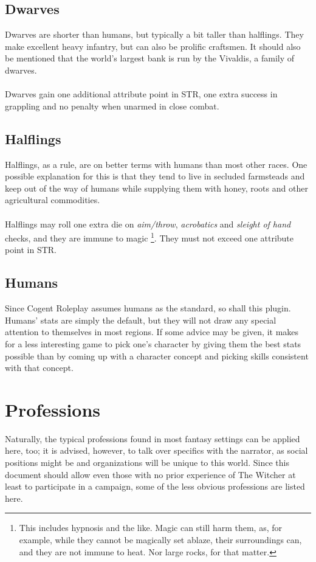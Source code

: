 \documentclass[parskip=full,11pt,%
footheight=38pt]{scrreport}
\begin{document}
\subsection{Dwarves}
Dwarves are shorter than humans, but typically a bit taller than halflings. They make excellent
heavy infantry, but can also be prolific craftsmen. It should also be mentioned that the world's
largest bank is run by the Vivaldis, a family of dwarves.
\\\\
Dwarves gain one additional attribute point in STR, one extra success in grappling and no penalty
when unarmed in close combat.

\subsection{Halflings}
Halflings, as a rule, are on better terms with humans than most other races. One possible explanation for this is that they tend to live
in secluded farmsteads and keep out of the way of humans while supplying them with honey, roots and other agricultural commodities.
\\\\
Halflings may roll one extra die on \textit{aim/throw}, \textit{acrobatics} and \textit{sleight of hand} checks, and they are immune to magic%
\footnote{This includes hypnosis and the like. Magic can still harm them, as, for example, while they cannot be magically set ablaze, their surroundings
	can, and they are not immune to heat. Nor large rocks, for that matter.}. They must not exceed one attribute point in STR.

\subsection{Humans}
Since Cogent Roleplay assumes humans as the standard, so shall this plugin. Humans' stats are simply the default,
but they will not draw any special attention to themselves in most regions. If some advice may be given, it makes
for a less interesting game to pick one's character by giving them the best stats possible than by coming up with
a character concept and picking skills consistent with that concept.

\section{Professions}
Naturally, the typical professions found in most fantasy settings can be applied here, too; it is advised, however, to talk over specifics with
the narrator, as social positions might be and organizations will be unique to this world. Since this document should allow even those with no
prior experience of The Witcher at least to participate in a campaign, some of the less obvious professions are listed here.
\end{document}
